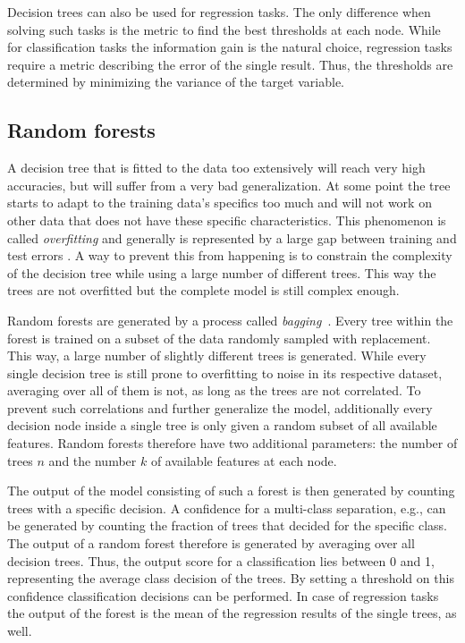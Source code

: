 Decision trees can also be used for regression tasks. The only difference when
solving such tasks is the metric to find the best thresholds at each node.
While for classification tasks the information gain is the natural choice, regression
tasks require a metric describing the error of the single result. Thus, the
thresholds are determined by minimizing the variance of the target variable.

\subsection{Random forests}
%
A decision tree that is fitted to the data too extensively will reach
very high accuracies, but will suffer from a very bad generalization. At some
point the tree starts to adapt to the training data's specifics too much and
will not work on other data that does not have these specific characteristics.
This phenomenon is called \textit{overfitting} and generally is represented by
a large gap between training and test errors \cite{goodfellow}. A way to
prevent this from happening is to constrain the complexity of the decision tree
while using a large number of different trees. This way the trees are not
overfitted but the complete model is still complex enough.

Random forests are generated by a process called
\textit{bagging}~\cite{bagging}. Every tree within the forest is trained on a
subset of the data randomly sampled with replacement. This way, a large number
of slightly different trees is generated. While every single decision tree is
still prone to overfitting to noise in its respective dataset, averaging over
all of them is not, as long as the trees are not correlated. To prevent such
correlations and further generalize the model, additionally every decision node
inside a single tree is only given a random subset of all available features.
Random forests therefore have two additional parameters: the number of trees
$n$ and the number $k$ of available features at each node.

The output of the model consisting of such a forest is then generated
by counting trees with a specific decision. A confidence for a multi-class
separation, e.g., can be generated by counting the fraction of trees that
decided for the specific class. The output of a random forest therefore is generated by averaging over all decision trees. Thus, the output score for a classification lies between \num{0} and \num{1}, representing the average class decision of the trees. By setting a threshold on this confidence
classification decisions can be performed. In case of regression tasks the
output of the forest is the mean of the regression results of the single trees,
as well.

